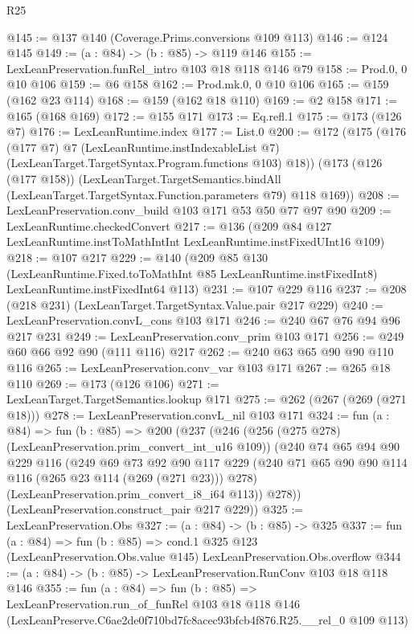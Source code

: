 \begin{lexlean}{R25}
\begin{coremodule}
@145 := @137 @140 (Coverage.Prims.conversions @109 @113)
@146 := @124 @145
@149 := (a : @84) -> (b : @85) -> @119 @146
@155 := LexLeanPreservation.funRel_intro @103 @18 @118 @146 @79
@158 := Prod.{0, 0} @10 @106
@159 := @6 @158
@162 := Prod.mk.{0, 0} @10 @106
@165 := @159 (@162 @23 @114)
@168 := @159 (@162 @18 @110)
@169 := @2 @158
@171 := @165 (@168 @169)
@172 := @155 @171
@173 := Eq.refl.{1}
@175 := @173 (@126 @7)
@176 := LexLeanRuntime.index
@177 := List.{0}
@200 := @172
    (@175
      (@176
        (@177 @7)
        @7
        (LexLeanRuntime.instIndexableList @7)
        (LexLeanTarget.TargetSyntax.Program.functions @103)
        @18))
    (@173
      (@126 (@177 @158))
      (LexLeanTarget.TargetSemantics.bindAll
        (LexLeanTarget.TargetSyntax.Function.parameters @79)
        @118
        @169))
@208 := LexLeanPreservation.conv_build @103 @171 @53 @50 @77 @97 @90
@209 := LexLeanRuntime.checkedConvert
@217 := @136 (@209 @84 @127 LexLeanRuntime.instToMathIntInt LexLeanRuntime.instFixedUInt16 @109)
@218 := @107 @217
@229 := @140
    (@209
      @85
      @130
      (LexLeanRuntime.Fixed.toToMathInt @85 LexLeanRuntime.instFixedInt8)
      LexLeanRuntime.instFixedInt64
      @113)
@231 := @107 @229 @116
@237 := @208 (@218 @231) (LexLeanTarget.TargetSyntax.Value.pair @217 @229)
@240 := LexLeanPreservation.convL_cons @103 @171
@246 := @240 @67 @76 @94 @96 @217 @231
@249 := LexLeanPreservation.conv_prim @103 @171
@256 := @249 @60 @66 @92 @90 (@111 @116) @217
@262 := @240 @63 @65 @90 @90 @110 @116
@265 := LexLeanPreservation.conv_var @103 @171
@267 := @265 @18 @110
@269 := @173 (@126 @106)
@271 := LexLeanTarget.TargetSemantics.lookup @171
@275 := @262 (@267 (@269 (@271 @18)))
@278 := LexLeanPreservation.convL_nil @103 @171
@324 := fun (a : @84) =>
  fun (b : @85) =>
  @200
    (@237
      (@246
        (@256 (@275 @278) (LexLeanPreservation.prim_convert_int_u16 @109))
        (@240
          @74
          @65
          @94
          @90
          @229
          @116
          (@249
            @69
            @73
            @92
            @90
            @117
            @229
            (@240 @71 @65 @90 @90 @114 @116 (@265 @23 @114 (@269 (@271 @23))) @278)
            (LexLeanPreservation.prim_convert_i8_i64 @113))
          @278))
      (LexLeanPreservation.construct_pair @217 @229))
@325 := LexLeanPreservation.Obs
@327 := (a : @84) -> (b : @85) -> @325
@337 := fun (a : @84) =>
  fun (b : @85) =>
  cond.{1} @325 @123 (LexLeanPreservation.Obs.value @145) LexLeanPreservation.Obs.overflow
@344 := (a : @84) -> (b : @85) -> LexLeanPreservation.RunConv @103 @18 @118 @146
@355 := fun (a : @84) =>
  fun (b : @85) =>
  LexLeanPreservation.run_of_funRel
    @103
    @18
    @118
    @146
    (LexLeanPreserve.C6ae2de0f710bd7fc8acec93bfcb4f876.R25.__rel_0 @109 @113)
\end{coremodule}
\end{lexlean}
